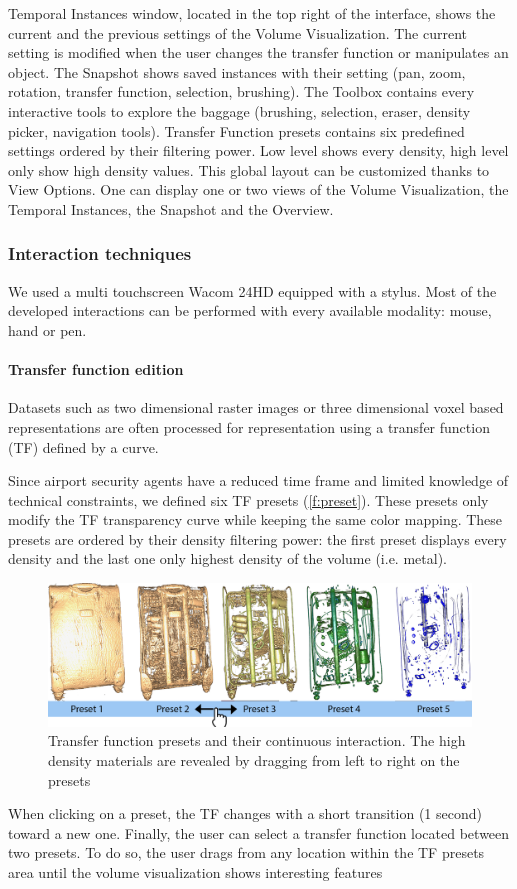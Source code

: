 Temporal Instances window, located in the top right of the interface, shows the current and the previous settings of the Volume Visualization. The current setting is modified when the user changes the transfer function or manipulates an object.
The Snapshot shows saved instances with their setting (pan, zoom, rotation, transfer function, selection, brushing).
The Toolbox contains every interactive tools to explore the baggage (brushing, selection, eraser, density picker, navigation tools).
Transfer Function presets contains six predefined settings ordered by their filtering power. Low level shows every density, high level only show high density values. 
This global layout can be customized thanks to View Options. One can display one or two views of the Volume Visualization, the Temporal Instances, the Snapshot and the Overview.

\subsubsection{Interaction techniques}

We used a multi touchscreen Wacom 24HD equipped with a stylus. Most of the developed interactions can be performed with every available modality: mouse, hand or pen.
\paragraph{ Transfer function edition}	
Datasets such as two dimensional raster images or three dimensional voxel based representations are often processed for representation using a transfer function (TF) defined by a curve. 

Since airport security agents have a reduced time frame and limited knowledge of technical constraints, we defined six TF presets (\autoref{f:preset}). These presets only modify the TF transparency curve while keeping the same color mapping. These presets are ordered by their density filtering power: the first preset displays every density and the last one only highest density of the volume (i.e. metal). 

\begin{figure}
   \centering   
	\includegraphics[width=15cm]{Figures/preset.png}
	\caption{ Transfer function presets and their continuous interaction. The high density materials are revealed by dragging from left to right on the presets }
	\label{f:preset}
\end{figure}
When clicking on a preset, the TF changes with a short transition (1 second) toward a new one. 
Finally, the user can select a transfer function located between two presets. To do so, the user drags from any location within the TF presets area until the volume visualization shows interesting features 

